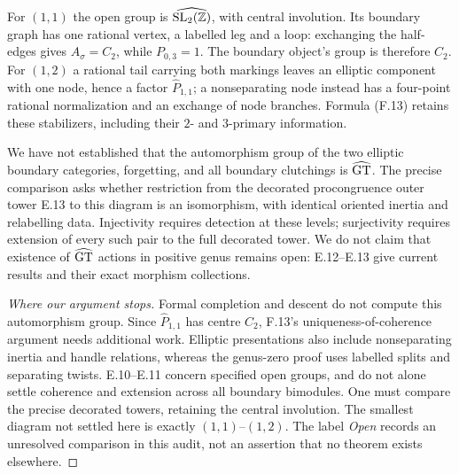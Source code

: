 For $(1,1)$ the open group is $\widehat{\mathrm{SL}_2(\mathbb Z)}$, with central involution. Its boundary graph has one rational vertex, a labelled leg and a loop: exchanging the half-edges gives $A_\sigma=C_2$, while $P_{0,3}=1$. The boundary object's group is therefore $C_2$. For $(1,2)$ a rational tail carrying both markings leaves an elliptic component with one node, hence a factor $\widehat P_{1,1}$; a nonseparating node instead has a four-point rational normalization and an exchange of node branches. Formula (F.13) retains these stabilizers, including their $2$- and $3$-primary information.

We have not established that the automorphism group of the two elliptic boundary categories, forgetting, and all boundary clutchings is $\widehat{\mathrm{GT}}$. The precise comparison asks whether restriction from the decorated procongruence outer tower E.13 to this diagram is an isomorphism, with identical oriented inertia and relabelling data. Injectivity requires detection at these levels; surjectivity requires extension of every such pair to the full decorated tower. We do not claim that existence of $\widehat{\mathrm{GT}}$ actions in positive genus remains open: E.12--E.13 give current results and their exact morphism collections.
\begin{proof}[Where our argument stops]
Formal completion and descent do not compute this automorphism group. Since $\widehat P_{1,1}$ has centre $C_2$, F.13's uniqueness-of-coherence argument needs additional work. Elliptic presentations also include nonseparating inertia and handle relations, whereas the genus-zero proof uses labelled splits and separating twists. E.10--E.11 concern specified open groups, and do not alone settle coherence and extension across all boundary bimodules. One must compare the precise decorated towers, retaining the central involution. The smallest diagram not settled here is exactly $(1,1)$--$(1,2)$. The label \emph{Open} records an unresolved comparison in this audit, not an assertion that no theorem exists elsewhere.
\end{proof}

